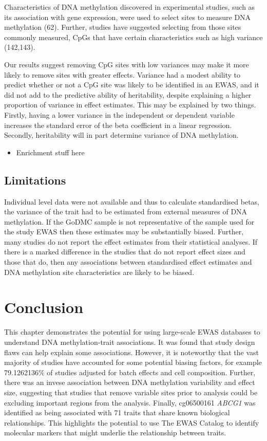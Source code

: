 \documentclass[11pt,oneside]{bristolthesis}
\providecommand{\tightlist}{%
  \setlength{\itemsep}{0pt}\setlength{\parskip}{0pt}}
\begin{document}
Characteristics of DNA methylation discovered in experimental studies, such as its association with gene expression, were used to select sites to measure DNA methylation (62). Further, studies have suggested selecting from those sites commonly measured, CpGs that have certain characteristics such as high variance (142,143).

Our results suggest removing CpG sites with low variances may make it more likely to remove sites with greater effects. Variance had a modest ability to predict whether or not a CpG site was likely to be identified in an EWAS, and it did not add to the predictive ability of heritability, despite explaining a higher proportion of variance in effect estimates. This may be explained by two things. Firstly, having a lower variance in the independent or dependent variable increases the standard error of the beta coefficient in a linear regression. Secondly, heritability will in part determine variance of DNA methylation.
\begin{itemize}
\tightlist
\item
  Enrichment stuff here
\end{itemize}
\hypertarget{limitations}{%
\subsection{Limitations}\label{limitations}}

Individual level data were not available and thus to calculate standardised betas, the variance of the trait had to be estimated from external measures of DNA methylation. If the GoDMC sample is not representative of the sample used for the study EWAS then these estimates may be substantially biased. Further, many studies do not report the effect estimates from their statistical analyses. If there is a marked difference in the studies that do not report effect sizes and those that do, then any associations between standardised effect estimates and DNA methylation site characteristics are likely to be biased.

\hypertarget{conclusion-04}{%
\section{Conclusion}\label{conclusion-04}}

This chapter demonstrates the potential for using large-scale EWAS databases to understand DNA methylation-trait associations. It was found that study design flaws can help explain some associations. However, it is noteworthy that the vast majority of studies have accounted for some potential biasing factors, for example 79.1262136\% of studies adjusted for batch effects and cell composition. Further, there was an invese association between DNA methylation variability and effect size, suggesting that studies that remove variable sites prior to analysis could be excluding important regions from the analysis. Finally, cg06500161 \emph{ABCG1} was identified as being associated with 71 traits that share known biological relationships. This highlights the potential to use The EWAS Catalog to identify molecular markers that might underlie the relationship between traits.
\end{document}
